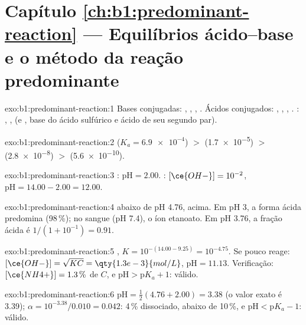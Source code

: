 \section*{Capítulo \ref{ch:b1:predominant-reaction} --- Equilíbrios ácido--base e o método da reação predominante}

\begin{solution}{exo:b1:predominant-reaction:1}
Bases conjugadas: , , , . Ácidos
conjugados: , , , . :
, ,  (e , base do ácido
sulfúrico e ácido de seu segundo par).
\end{solution}

\begin{solution}{exo:b1:predominant-reaction:2}
 ($K_a = \num{6.9e-4}$) $>$  (\num{1.7e-5}) $>$ 
(\num{2.8e-8}) $>$  (\num{5.6e-10}).
\end{solution}

\begin{solution}{exo:b1:predominant-reaction:3}
: $\mathrm{pH} = 2.00$. : $[\ce{OH-}] = 10^{-2}$,
$\mathrm{pH} = 14.00 - 2.00 = 12.00$.
\end{solution}

\begin{solution}{exo:b1:predominant-reaction:4}
 abaixo de pH 4.76,  acima. Em pH 3, a forma
ácida predomina (98\,\%); no sangue (pH 7.4), o íon etanoato. Em pH 3.76,
a fração ácida é $1/(1 + 10^{-1}) = 0.91$.
\end{solution}

\begin{solution}{exo:b1:predominant-reaction:5}
 , $K = 10^{-(14.00 -
9.25)} = 10^{-4.75}$. Se pouco  reage: $[\ce{OH-}] = \sqrt{K C} =
\qty{1.3e-3}{mol/L}$, $\mathrm{pH} = 11.13$. Verificação: $[\ce{NH4+}] = 1.3\,\%$
de $C$, e $\mathrm{pH} > \mathrm{p}K_a + 1$: válido.
\end{solution}

\begin{solution}{exo:b1:predominant-reaction:6}
$\mathrm{pH} = \frac12(4.76 + 2.00) = 3.38$ (o valor exato é 3.39);
$\alpha = 10^{-3.38}/0.010 = 0.042$: 4\,\% dissociado, abaixo de 10\,\%,
e $\mathrm{pH} < \mathrm{p}K_a - 1$: válido.
\end{solution}

